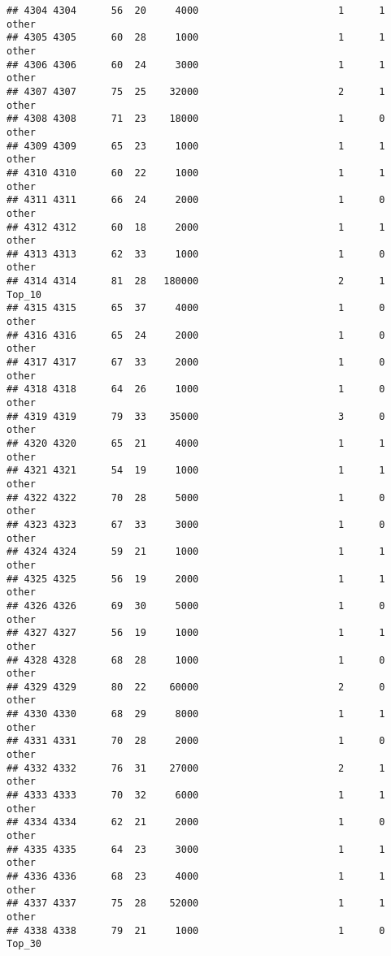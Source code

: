 \documentclass[
]{article}
\begin{document}
\begin{verbatim}
## 4304 4304      56  20     4000                        1      1    other
## 4305 4305      60  28     1000                        1      1    other
## 4306 4306      60  24     3000                        1      1    other
## 4307 4307      75  25    32000                        2      1    other
## 4308 4308      71  23    18000                        1      0    other
## 4309 4309      65  23     1000                        1      1    other
## 4310 4310      60  22     1000                        1      1    other
## 4311 4311      66  24     2000                        1      0    other
## 4312 4312      60  18     2000                        1      1    other
## 4313 4313      62  33     1000                        1      0    other
## 4314 4314      81  28   180000                        2      1   Top_10
## 4315 4315      65  37     4000                        1      0    other
## 4316 4316      65  24     2000                        1      0    other
## 4317 4317      67  33     2000                        1      0    other
## 4318 4318      64  26     1000                        1      0    other
## 4319 4319      79  33    35000                        3      0    other
## 4320 4320      65  21     4000                        1      1    other
## 4321 4321      54  19     1000                        1      1    other
## 4322 4322      70  28     5000                        1      0    other
## 4323 4323      67  33     3000                        1      0    other
## 4324 4324      59  21     1000                        1      1    other
## 4325 4325      56  19     2000                        1      1    other
## 4326 4326      69  30     5000                        1      0    other
## 4327 4327      56  19     1000                        1      1    other
## 4328 4328      68  28     1000                        1      0    other
## 4329 4329      80  22    60000                        2      0    other
## 4330 4330      68  29     8000                        1      1    other
## 4331 4331      70  28     2000                        1      0    other
## 4332 4332      76  31    27000                        2      1    other
## 4333 4333      70  32     6000                        1      1    other
## 4334 4334      62  21     2000                        1      0    other
## 4335 4335      64  23     3000                        1      1    other
## 4336 4336      68  23     4000                        1      1    other
## 4337 4337      75  28    52000                        1      1    other
## 4338 4338      79  21     1000                        1      0   Top_30

\end{verbatim}
\end{document}
